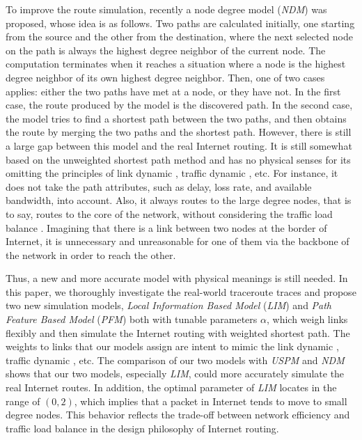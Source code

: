 \documentclass[a4paper]{llncs}
\begin{document}
To improve the route simulation, recently a node degree model (\textit{NDM}) \cite{SimulatingInternetRoute} was proposed, whose idea is as follows. Two paths are calculated initially, one starting from the source and the other from the destination, where the next selected node on the path is always the highest degree neighbor of the current node. The computation terminates when it reaches a situation where a node is the highest degree neighbor of its own highest degree neighbor. Then, one of two cases applies: either the two paths have met at a node, or they have not. In the first case, the route produced by the model is the discovered path. In the second case, the model tries to find a shortest path between the two paths, and then obtains the route by merging the two paths and the shortest path. However, there is still a large gap between this model and the real Internet routing. It is still somewhat based on the unweighted shortest path method and has no physical senses for its omitting the
principles of link dynamic \cite{PathDiversity}, traffic dynamic \cite{TrafficDynamicLocal}, etc. For
instance, it does not take the path attributes, such as delay, loss
rate, and available bandwidth, into account. Also, it always routes
to the large degree nodes, that is to say, routes to the core of the
network, without considering the traffic load balance \cite{LoadBalance,LoadBalance2}. Imagining that
there is a link between two nodes at the border of Internet, it is unnecessary
and unreasonable for one of them via the backbone of the
network in order to reach the other.


Thus, a new and more accurate model with physical meanings is still needed. In this paper, we thoroughly investigate the real-world
traceroute traces and propose two new simulation models, \textit{Local Information Based Model} (\textit{LIM}) and \textit{Path Feature Based Model} (\textit{PFM}) both with tunable parameters $\alpha$, which weigh links flexibly and then simulate the Internet routing with weighted shortest path. The weights to links that our models assign are intent to mimic the link dynamic \cite{PathDiversity}, traffic dynamic \cite{TrafficDynamicLocal}, etc. The comparison of our two models with \textit{USPM} and \textit{NDM} shows that our two models, especially \textit{LIM}, could more accurately simulate the real Internet routes. In addition, the optimal parameter of \textit{LIM} locates in the range of $(0,2)$, which implies that a packet in Internet tends to move to small degree nodes. This behavior reflects the trade-off between network efficiency and traffic load balance in the design philosophy of Internet routing.
\end{document}
